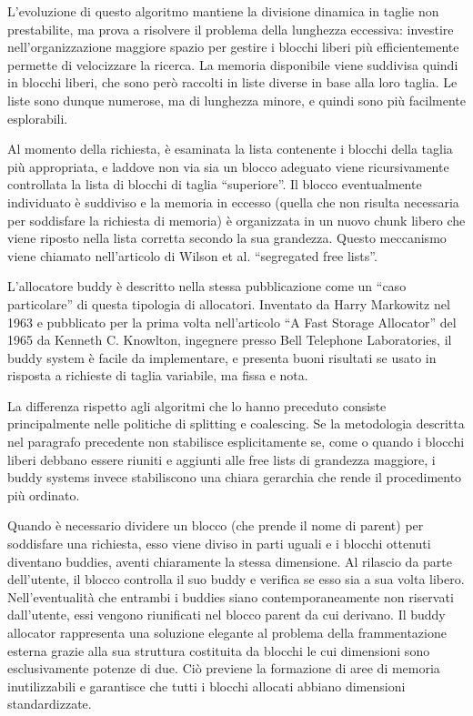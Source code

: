 L’evoluzione di questo algoritmo mantiene la divisione dinamica in taglie non prestabilite, ma prova a risolvere il problema della lunghezza eccessiva: investire nell’organizzazione maggiore spazio per gestire i blocchi liberi più efficientemente permette di velocizzare la ricerca. La memoria disponibile viene suddivisa quindi in blocchi liberi, che sono però raccolti in liste diverse in base alla loro taglia. Le liste sono dunque numerose, ma di lunghezza minore, e quindi sono più facilmente esplorabili.

Al momento della richiesta, è esaminata la lista contenente i blocchi della taglia più appropriata, e laddove non via sia un blocco adeguato viene ricursivamente controllata la lista di blocchi di taglia “superiore”. Il blocco eventualmente individuato è suddiviso e la memoria in eccesso (quella che non risulta necessaria per soddisfare la richiesta di memoria) è organizzata in un nuovo chunk libero che viene riposto nella lista corretta secondo la sua grandezza. Questo meccanismo viene chiamato nell’articolo di Wilson et al. “segregated free lists”.

L’allocatore buddy è descritto nella stessa pubblicazione come un “caso particolare” di questa tipologia di allocatori. Inventato da Harry Markowitz nel 1963 e pubblicato per la prima volta nell’articolo “A Fast Storage Allocator” del 1965 da Kenneth C. Knowlton, ingegnere presso Bell Telephone Laboratories, il buddy system è facile da implementare, e presenta buoni risultati se usato in risposta a richieste di taglia variabile, ma fissa e nota.

La differenza rispetto agli algoritmi che lo hanno preceduto consiste principalmente nelle politiche di splitting e coalescing. Se la metodologia descritta nel paragrafo precedente non stabilisce esplicitamente se, come o quando i blocchi liberi debbano essere riuniti e aggiunti alle free lists di grandezza maggiore, i buddy systems invece stabiliscono una chiara gerarchia che rende il procedimento più ordinato.

Quando è necessario dividere un blocco (che prende il nome di parent) per soddisfare una richiesta, esso viene diviso in parti uguali e i blocchi ottenuti diventano buddies, aventi chiaramente la stessa dimensione. Al rilascio da parte dell’utente, il blocco controlla il suo buddy e verifica se esso sia a sua volta libero. Nell’eventualità che entrambi i buddies siano contemporaneamente non riservati dall’utente, essi vengono riunificati nel blocco parent da cui derivano. Il buddy allocator rappresenta una soluzione elegante al problema della frammentazione esterna grazie alla sua struttura costituita da blocchi le cui dimensioni sono esclusivamente potenze di due. Ciò previene la formazione di aree di memoria inutilizzabili e garantisce che tutti i blocchi allocati abbiano dimensioni standardizzate.

